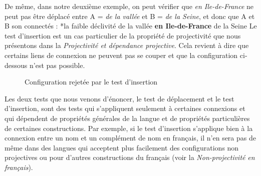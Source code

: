 De même, dans notre deuxième exemple, on peut vérifier que \textit{en Ile-de-France} ne peut pas être déplacé entre A = \textit{de la vallée} et B = \textit{de la Seine}, et donc que A et B son connectés :
\ea
    *{la faible déclivité de la vallée} \textbf{{en Ile-de-France}}  {de la Seine}
\z
Le test d’insertion est un cas particulier de la propriété de projectivité que nous présentons dans la  \textit{Projectivité et dépendance projective}. Cela revient à dire que certains liens de connexion ne peuvent pas se couper et que la configuration ci-dessous n’est pas possible.

\begin{figure}
\caption{\label{fig:}Configuration rejetée par le test d’insertion}
\end{figure}

Les deux tests que nous venons d’énoncer, le test de déplacement et le test d’insertion, sont des tests qui s’appliquent seulement à certaines connexions et qui dépendent de propriétés générales de la langue et de propriétés particulières de certaines constructions. Par exemple, si le test d’insertion s’applique bien à la connexion entre un nom et un complément de nom en français, il n’en sera pas de même dans des langues qui acceptent plus facilement des configurations non projectives ou pour d’autres constructions du français (voir la  \textit{Non-projectivité} \textit{en français}).

